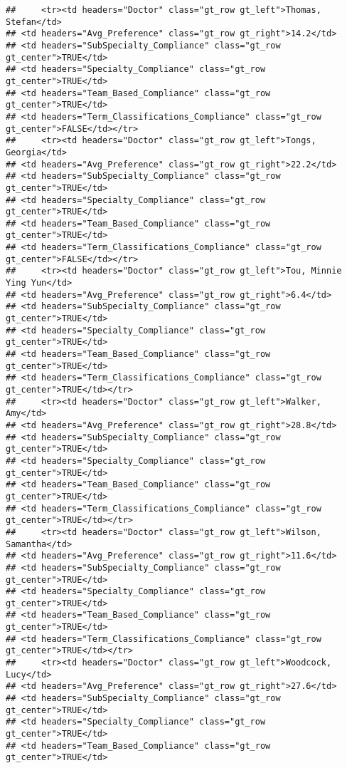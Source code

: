 \documentclass[
]{article}
\begin{document}
\begin{verbatim}
##     <tr><td headers="Doctor" class="gt_row gt_left">Thomas, Stefan</td>
## <td headers="Avg_Preference" class="gt_row gt_right">14.2</td>
## <td headers="SubSpecialty_Compliance" class="gt_row gt_center">TRUE</td>
## <td headers="Specialty_Compliance" class="gt_row gt_center">TRUE</td>
## <td headers="Team_Based_Compliance" class="gt_row gt_center">TRUE</td>
## <td headers="Term_Classifications_Compliance" class="gt_row gt_center">FALSE</td></tr>
##     <tr><td headers="Doctor" class="gt_row gt_left">Tongs, Georgia</td>
## <td headers="Avg_Preference" class="gt_row gt_right">22.2</td>
## <td headers="SubSpecialty_Compliance" class="gt_row gt_center">TRUE</td>
## <td headers="Specialty_Compliance" class="gt_row gt_center">TRUE</td>
## <td headers="Team_Based_Compliance" class="gt_row gt_center">TRUE</td>
## <td headers="Term_Classifications_Compliance" class="gt_row gt_center">FALSE</td></tr>
##     <tr><td headers="Doctor" class="gt_row gt_left">Tou, Minnie Ying Yun</td>
## <td headers="Avg_Preference" class="gt_row gt_right">6.4</td>
## <td headers="SubSpecialty_Compliance" class="gt_row gt_center">TRUE</td>
## <td headers="Specialty_Compliance" class="gt_row gt_center">TRUE</td>
## <td headers="Team_Based_Compliance" class="gt_row gt_center">TRUE</td>
## <td headers="Term_Classifications_Compliance" class="gt_row gt_center">TRUE</td></tr>
##     <tr><td headers="Doctor" class="gt_row gt_left">Walker, Amy</td>
## <td headers="Avg_Preference" class="gt_row gt_right">28.8</td>
## <td headers="SubSpecialty_Compliance" class="gt_row gt_center">TRUE</td>
## <td headers="Specialty_Compliance" class="gt_row gt_center">TRUE</td>
## <td headers="Team_Based_Compliance" class="gt_row gt_center">TRUE</td>
## <td headers="Term_Classifications_Compliance" class="gt_row gt_center">TRUE</td></tr>
##     <tr><td headers="Doctor" class="gt_row gt_left">Wilson, Samantha</td>
## <td headers="Avg_Preference" class="gt_row gt_right">11.6</td>
## <td headers="SubSpecialty_Compliance" class="gt_row gt_center">TRUE</td>
## <td headers="Specialty_Compliance" class="gt_row gt_center">TRUE</td>
## <td headers="Team_Based_Compliance" class="gt_row gt_center">TRUE</td>
## <td headers="Term_Classifications_Compliance" class="gt_row gt_center">TRUE</td></tr>
##     <tr><td headers="Doctor" class="gt_row gt_left">Woodcock, Lucy</td>
## <td headers="Avg_Preference" class="gt_row gt_right">27.6</td>
## <td headers="SubSpecialty_Compliance" class="gt_row gt_center">TRUE</td>
## <td headers="Specialty_Compliance" class="gt_row gt_center">TRUE</td>
## <td headers="Team_Based_Compliance" class="gt_row gt_center">TRUE</td>

\end{verbatim}
\end{document}
